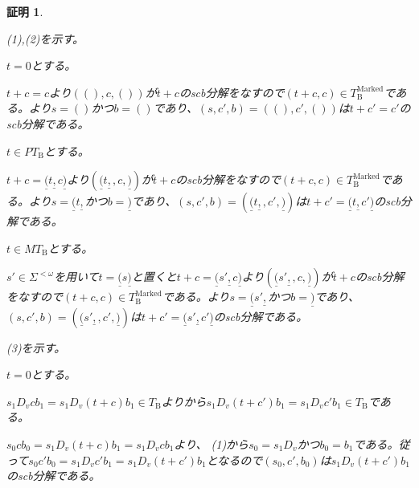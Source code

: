 \documentclass[dvipdfmx,uplatex]{jsarticle}
\theoremstyle{customnonumberbreakfortheorem}
\theoremstyle{customnonumberbreakforproof}
\newtheorem{hideableproof}{証明}
\begin{document}
\begin{hideableproof}
	\begin{indented}
		\item (1),(2)を示す。
		\item \(t = 0\)とする。
		\begin{indented}
			\item \(t+c = c\)より\(((),c,())\)が\(t+c\)のscb分解をなすので\((t+c,c) \in T_{\textrm{B}}^{\textrm{Marked}}\)である。より\(s = ()\)かつ\(b = ()\)であり、\((s,c',b) = ((),c',())\)は\(t+c' = c'\)のscb分解である。
		\end{indented}
		\item \(t \in PT_{\textrm{B}}\)とする。
		\begin{indented}
			\item \(t+c = \underline{(} t \underline{,} c \underline{)}\)より\((\underline{(} t \underline{,},c,\underline{)})\)が\(t+c\)のscb分解をなすので\((t+c,c) \in T_{\textrm{B}}^{\textrm{Marked}}\)である。より\(s = \underline{(} t \underline{,}\)かつ\(b = \underline{)}\)であり、\((s,c',b) = (\underline{(} t \underline{,},c',\underline{)})\)は\(t+c' = \underline{(} t \underline{,} c' \underline{)}\)のscb分解である。
		\end{indented}
		\item \(t \in MT_{\textrm{B}}\)とする。
		\begin{indented}
			\item \(s' \in \Sigma^{< \omega}\)を用いて\(t = \underline{(} s \underline{)}\)と置くと\(t+c = \underline{(} s' \underline{,} c \underline{)}\)より\((\underline{(} s' \underline{,},c,\underline{)})\)が\(t+c\)のscb分解をなすので\((t+c,c) \in T_{\textrm{B}}^{\textrm{Marked}}\)である。より\(s = \underline{(} s' \underline{,}\)かつ\(b = \underline{)}\)であり、\((s,c',b) = (\underline{(} s' \underline{,},c',\underline{)})\)は\(t+c' = \underline{(} s' \underline{,} c' \underline{)}\)のscb分解である。
		\end{indented}
		\item (3)を示す。
		\item \(t = 0\)とする。
		\begin{indented}
			\item \(s_1 D_v c b_1 = s_1 D_v(t+c) b_1 \in T_{\textrm{B}}\)よりから\(s_1 D_v(t+c') b_1 = s_1 D_v c' b_1 \in T_{\textrm{B}}\)である。
			\item \(s_0 c b_0 = s_1 D_v(t+c) b_1 = s_1 D_v c b_1\)より、 (1)から\(s_0 = s_1 D_v\)かつ\(b_0 = b_1\)である。従って\(s_0 c' b_0 = s_1 D_v c' b_1 = s_1 D_v(t+c') b_1\)となるので\((s_0,c',b_0)\)は\(s_1 D_v(t+c') b_1\)のscb分解である。

\end{indented}
\end{indented}
\end{hideableproof}
\end{document}
